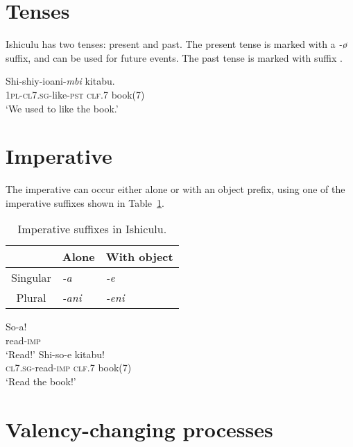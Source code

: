 \section{Tenses}

Ishiculu has two tenses: present and past. The present tense is marked with a \textit{-\o} suffix, and can be used for future events. The past tense is marked with suffix \textit{}.

\begin{exe}
\ex
\gll Shi-shiy-ioani-\textit{mbi}  kitabu. \\
\textsc{1pl}-\textsc{cl7.sg}-like-\textsc{pst} \textsc{clf}.7 book(7) \\
\trans `We used to like the book.'
\end{exe}

\section{Imperative}

The imperative can occur either alone or with an object prefix, using one of the imperative suffixes shown in Table~\ref{table:verbs:imperative}.

\begin{table}
\centering
\begin{tabular}{c|l|l}
\hline
& \multicolumn{1}{c|}{Alone} & \multicolumn{1}{c}{With object} \\
\hline
Singular & \textit{-a} & \textit{-e} \\
\hline
Plural & \textit{-ani} & \textit{-eni} \\
\hline
\end{tabular}
\caption{Imperative suffixes in Ishiculu.}
\label{table:verbs:imperative}
\end{table}

\begin{exe}
\ex
\gll So-a! \\
read-\textsc{imp} \\
\trans `Read!'
\ex
\gll Shi-so-e  kitabu! \\
\textsc{cl7.sg}-read-\textsc{imp} \textsc{clf}.7 book(7) \\
\trans `Read the book!'
\end{exe}

\section{Valency-changing processes}
